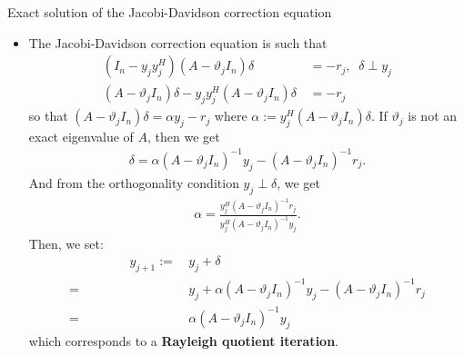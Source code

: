\documentclass[t,usepdftitle=false]{beamer}
\begin{document}
\begin{frame}{Exact solution of the Jacobi-Davidson correction equation}
\begin{itemize}
\item The Jacobi-Davidson correction equation is such that
\begin{align*}
(I_n-y_jy_j^H)(A-\vartheta_j I_n)\delta &\,=-r_j,\;\;\delta\perp y_j\\
(A-\vartheta_j I_n)\delta-y_jy_j^H(A-\vartheta_j I_n)\delta &\,=-r_j
\end{align*}
so that $(A-\vartheta_j I_n)\delta=\alpha y_j -r_j$ where $\alpha:=y_j^H(A-\vartheta_jI_n)\delta$.
If $\vartheta_j$ is not an exact eigenvalue of $A$, then we get
\begin{align*}
\delta=\alpha(A-\vartheta_jI_n)^{-1}y_j-(A-\vartheta_j I_n)^{-1}r_j.
\end{align*}
And from the orthogonality condition $y_j\perp\delta$, we get
\begin{align*}
\alpha=\frac{y_j^H(A-\vartheta_j I_n)^{-1}r_j}{y^H_j(A-\vartheta_jI_n)^{-1}y_j}.
\end{align*}
Then, we set:\vspace{-.65cm}
\begin{align*}
\hspace{2cm}
y_{j+1}
:=&\,y_j+\delta\\
=&\,y_j+\alpha(A-\vartheta_jI_n)^{-1}y_j-(A-\vartheta_j I_n)^{-1}r_j\\
=&\,\alpha(A-\vartheta_j I_n)^{-1}y_j
\end{align*}
which corresponds to a \textbf{Rayleigh quotient iteration}.
\end{itemize}
\end{frame}
\end{document}
